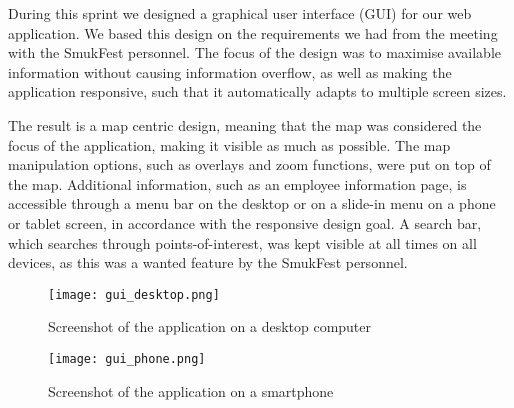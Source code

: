 During this sprint we designed a graphical user interface (GUI) for our web application. We based this design on the requirements we had from the meeting with the SmukFest personnel. The focus of the design was to maximise available information without causing information overflow, as well as making the application responsive, such that it automatically adapts to multiple screen sizes. 

The result is a map centric design, meaning that the map was considered the focus of the application, making it visible as much as possible. The map manipulation options, such as overlays and zoom functions, were put on top of the map. Additional information, such as an employee information page, is accessible through a menu bar on the desktop or on a slide-in menu on a phone or tablet screen, in accordance with the responsive design goal. A search bar, which searches through points-of-interest, was kept visible at all times on all devices, as this was a wanted feature by the SmukFest personnel.

\begin{figure}
    \centering
\texttt{[image: gui\_desktop.png]}
\caption{Screenshot of the application on a desktop computer}
\label{desktopscreenshot}
\end{figure}

\begin{figure}
    \centering
\texttt{[image: gui\_phone.png]}
\caption{Screenshot of the application on a smartphone}
\label{phonescreenshot}
\end{figure}
